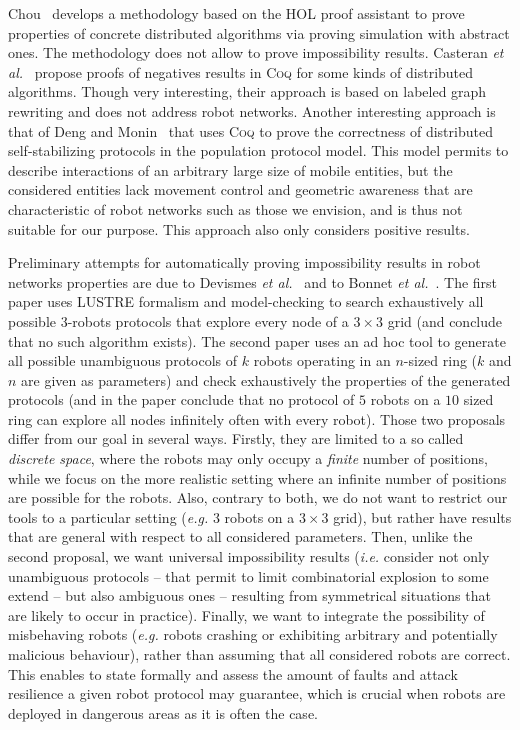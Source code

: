 \documentclass[11pt,a4]{llncs}
\newcommand{\x}{\xspace}
\newcommand{\coq}{\textsc{Coq}\x}
\begin{document}
Chou~\cite{chou95cj} develops a methodology based on the HOL proof
assistant to prove properties of concrete distributed algorithms via
proving simulation with abstract ones. The methodology does not allow
to prove impossibility results.
Casteran \emph{et al.}~\cite{casteran09scss} propose proofs of
negatives results in \coq for some kinds of
distributed algorithms. Though very interesting, their approach is
based on labeled graph rewriting and does not address robot
networks. Another interesting approach is that of Deng and
Monin~\cite{deng09tase} that uses \coq to prove the correctness of
distributed self-stabilizing protocols in the population protocol
model. This model permits to describe interactions of an arbitrary
large size of mobile entities, but the considered entities lack
movement control and geometric awareness that are characteristic of
robot networks such as those we envision, and is thus not suitable for
our purpose. This approach also only considers positive results.

Preliminary attempts for automatically proving impossibility results
in robot networks properties are due to Devismes \emph{et
  al.}~\cite{devismes12sss} and to Bonnet \emph{et
  al.}~\cite{bonnet12sss}. The first paper uses LUSTRE formalism and
model-checking to search exhaustively all possible 3-robots protocols
that explore every node of a $3\times 3$ grid (and conclude that no
such algorithm exists). The second paper uses an ad hoc tool to
generate all possible unambiguous protocols of $k$ robots operating in
an $n$-sized ring ($k$ and $n$ are given as parameters) and
check exhaustively the properties of the generated protocols (and in
the paper conclude that no protocol of $5$ robots on a $10$ sized ring
can explore all nodes infinitely often with every robot). Those two
proposals differ from our goal in several ways. Firstly, they are limited
to a so called \emph{discrete space}, where the robots may only occupy
a \emph{finite} number of positions, while we focus on the more
realistic setting where an infinite number of positions are possible
for the robots. Also, contrary to both, we do not want to restrict our
tools to a particular setting (\emph{e.g.} 3 robots on a $3\times 3$
grid), but rather have results that are general with respect to all
considered parameters. Then, unlike the second proposal, we want
universal impossibility results (\emph{i.e.} consider not only
unambiguous protocols -- that permit to limit combinatorial explosion
to some extend -- but also ambiguous ones -- resulting from
symmetrical situations that are likely to occur in practice). Finally,
we want to integrate the possibility of misbehaving robots
(\emph{e.g.} robots crashing or exhibiting arbitrary and potentially
malicious behaviour), rather than assuming that all considered robots
are correct. This enables to state formally and assess the amount of
faults and attack resilience a given robot protocol may guarantee,
which is crucial when robots are deployed in dangerous areas as it is
often the case.
\end{document}
